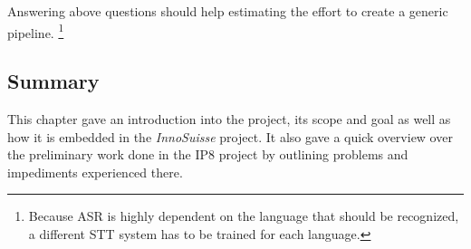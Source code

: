 Answering above questions should help estimating the effort to create a generic pipeline. \footnote{Because \ac{ASR} is highly dependent on the language that should be recognized, a different \ac{STT} system has to be trained for each language.}

\subsection{Summary}
This chapter gave an introduction into the project, its scope and goal as well as how it is embedded in the \textit{InnoSuisse} project. It also gave a quick overview over the preliminary work done in the IP8 project by outlining problems and impediments experienced there.